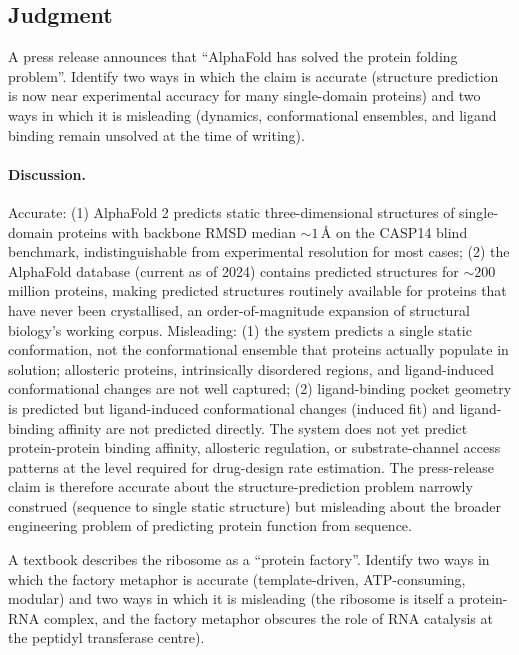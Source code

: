 \subsection*{Judgment}

\begin{exercise}
A press release announces that ``AlphaFold has solved the protein
folding problem''. Identify two ways in which the claim is accurate
(structure prediction is now near experimental accuracy for many
single-domain proteins) and two ways in which it is misleading
(dynamics, conformational ensembles, and ligand binding remain
unsolved at the time of writing).
\end{exercise}

\paragraph{Discussion.}
Accurate: (1) AlphaFold 2 \cite{paper:v6c04-jumper-alphafold-2021}
predicts static three-dimensional structures of single-domain
proteins with backbone RMSD median $\sim 1\,\si{\angstrom}$ on the
CASP14 blind benchmark, indistinguishable from experimental
resolution for most cases; (2) the AlphaFold database (current as
of 2024) contains predicted structures for $\sim 200$ million
proteins, making predicted structures routinely available for
proteins that have never been crystallised, an order-of-magnitude
expansion of structural biology's working corpus. Misleading: (1)
the system predicts a single static conformation, not the
conformational ensemble that proteins actually populate in solution;
allosteric proteins, intrinsically disordered regions, and
ligand-induced conformational changes are not well captured; (2)
ligand-binding pocket geometry is predicted but ligand-induced
conformational changes (induced fit) and ligand-binding affinity are
not predicted directly. The system does not yet predict
protein-protein binding affinity, allosteric regulation, or
substrate-channel access patterns at the level required for
drug-design rate estimation. The press-release claim is therefore
accurate about the structure-prediction problem narrowly construed
(sequence to single static structure) but misleading about the
broader engineering problem of predicting protein function from
sequence.

\begin{exercise}
A textbook describes the ribosome as a ``protein factory''.
Identify two ways in which the factory metaphor is accurate
(template-driven, ATP-consuming, modular) and two ways in which it
is misleading (the ribosome is itself a protein-RNA complex, and the
factory metaphor obscures the role of RNA catalysis at the peptidyl
transferase centre).
\end{exercise}

